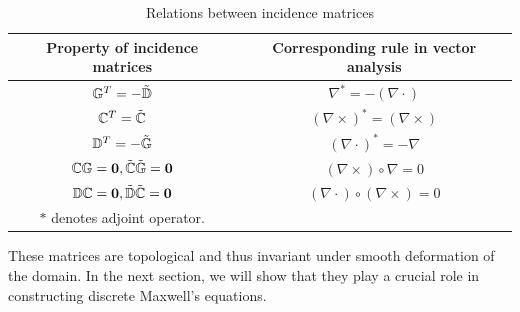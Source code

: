 \documentclass{article}
\begin{document}
\begin{table}[h!]
    \centering
    \begin{tabular}{c c}
    \hline
         Property of incidence matrices & Corresponding rule in vector analysis \\
    \hline
         $\mathbb{G}^T = -\Tilde{\mathbb{D}}$  &  $\nabla ^* = - (\nabla \cdot) $\\
         $\mathbb{C}^T = \Tilde{\mathbb{C}}$   &  $(\nabla \times) ^* = (\nabla \times) $\\
         $\mathbb{D}^T = -\Tilde{\mathbb{G}}$  &  $(\nabla \cdot) ^* = - \nabla $\\
         $\mathbb{C}\mathbb{G} = \mathbf{0}, \Tilde{\mathbb{C}}\Tilde{\mathbb{G}} = \mathbf{0}$  &  $(\nabla \times)\circ \nabla = 0$ \\
         $\mathbb{D}\mathbb{C} = \mathbf{0}, \Tilde{\mathbb{D}}\Tilde{\mathbb{C}} = \mathbf{0}$   &  $(\nabla \cdot) \circ ( \nabla \times) = 0$ \\
    \hline
        \small $\ast$ denotes adjoint operator.
    \end{tabular}
    \caption{Relations between incidence matrices}
    \label{tab:incidence_relation}
\end{table}

These matrices are topological and thus invariant under smooth deformation of the domain. In the next section, we will show that they play a crucial role in constructing discrete Maxwell's equations. 
\end{document}
